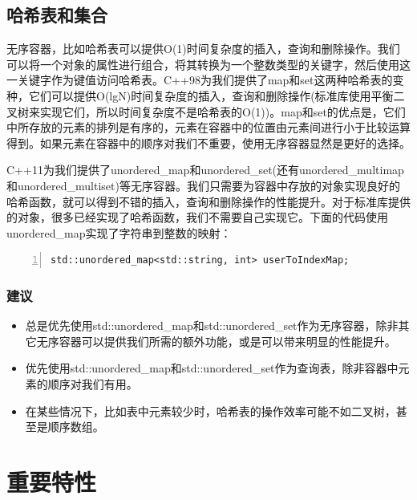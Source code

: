 \documentclass{ctexart}
\begin{document}
\subsection{哈希表和集合}

无序容器，比如哈希表可以提供O(1)时间复杂度的插入，查询和删除操作。我们可以将一个对象的属性进行组合，将其转换为一个整数类型的关键字，然后使用这一关键字作为键值访问哈希表。C++98为我们提供了map和set这两种哈希表的变种，它们可以提供O(lgN)时间复杂度的插入，查询和删除操作(标准库使用平衡二叉树来实现它们，所以时间复杂度不是哈希表的O(1))。map和set的优点是，它们中所存放的元素的排列是有序的，元素在容器中的位置由元素间进行小于比较运算得到。如果元素在容器中的顺序对我们不重要，使用无序容器显然是更好的选择。

C++11为我们提供了unordered\_map和unordered\_set(还有unordered\_multimap和unordered\_multiset)等无序容器。我们只需要为容器中存放的对象实现良好的哈希函数，就可以得到不错的插入，查询和删除操作的性能提升。对于标准库提供的对象，很多已经实现了哈希函数，我们不需要自己实现它。下面的代码使用unordered\_map实现了字符串到整数的映射：

\begin{lstlisting}[language={[ANSI]C},keywordstyle=\color{blue!70},commentstyle=\color{red!50!green!50!blue!50},frame=shadowbox, rulesepcolor=\color{red!20!green!20!blue!20},basicstyle=\small,numbers=left, numberstyle=\tiny,breaklines=true]
std::unordered_map<std::string, int> userToIndexMap;
\end{lstlisting}

\subsubsection*{建议}

\begin{itemize}
	\item 总是优先使用std::unordered\_map和std::unordered\_set作为无序容器，除非其它无序容器可以提供我们所需的额外功能，或是可以带来明显的性能提升。
	\item 优先使用std::unordered\_map和std::unordered\_set作为查询表，除非容器中元素的顺序对我们有用。
	\item 在某些情况下，比如表中元素较少时，哈希表的操作效率可能不如二叉树，甚至是顺序数组。
\end{itemize}

\newpage
\section{重要特性}
\end{document}
